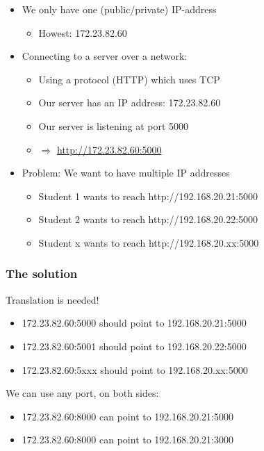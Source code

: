 \documentclass{article}
\begin{document}
\begin{itemize}
    \item We only have one (public/private) IP-address
    \begin{itemize}
        \item Howest: 172.23.82.60
    \end{itemize}
    \item Connecting to a server over a network:
    \begin{itemize}
        \item Using a protocol (HTTP) which uses TCP
        \item Our server has an IP address: 172.23.82.60
        \item Our server is listening at port 5000
        \item $\Rightarrow$ \url{http://172.23.82.60:5000}
    \end{itemize}
    \item Problem: We want to have multiple IP addresses
    \begin{itemize}
        \item Student 1 wants to reach http://192.168.20.21:5000
        \item Student 2 wants to reach http://192.168.20.22:5000
        \item Student x  wants to reach http://192.168.20.xx:5000
    \end{itemize}
\end{itemize}

\subsubsection{The solution}

Translation is needed!

\begin{itemize}
    \item 172.23.82.60:5000 should point to 192.168.20.21:5000
    \item 172.23.82.60:5001 should point to 192.168.20.22:5000
    \item 172.23.82.60:5xxx should point to 192.168.20.xx:5000
\end{itemize}

We can use any port, on both sides:

\begin{itemize}
    \item 172.23.82.60:8000 can point to 192.168.20.21:5000
    \item 172.23.82.60:8000 can point to 192.168.20.21:3000
\end{itemize}
\end{document}
